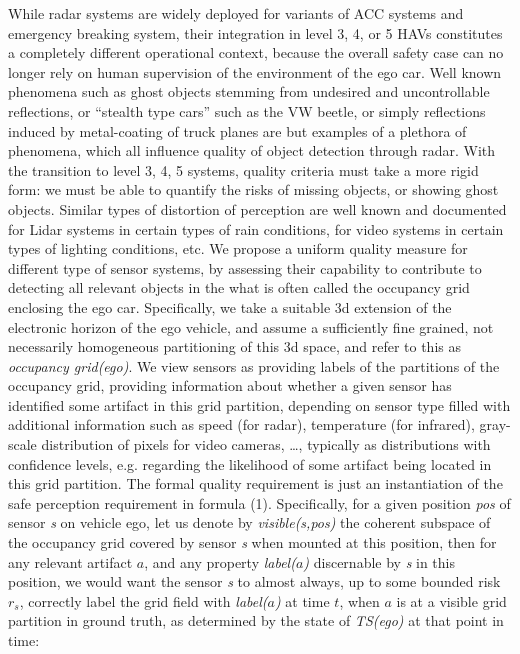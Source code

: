 While radar systems are widely deployed for variants of ACC systems and emergency breaking system, their integration in level 3, 4, or 5 HAVs constitutes a completely different operational context, because the overall safety case can no longer rely on human supervision of the environment of the ego car. Well known phenomena such as ghost objects stemming from undesired and uncontrollable reflections, or \enquote{stealth type cars} such as the VW beetle, or simply reflections induced by metal-coating of truck planes are but examples of a plethora of phenomena, which all influence quality of object detection through radar. With the transition to level 3, 4, 5 systems, quality criteria must take a more rigid form: we must be able to quantify the risks of missing objects, or showing ghost objects. Similar types of distortion of perception are well known and documented for Lidar systems in certain types of rain conditions, for video systems in certain types of lighting conditions, etc. We propose a uniform quality measure for different type of sensor systems, by assessing their capability to contribute to detecting all relevant objects in the what is often called the occupancy grid enclosing the ego car. Specifically, we take a suitable 3d extension of the electronic horizon of the ego vehicle, and assume a sufficiently fine grained, not necessarily homogeneous partitioning of this 3d space, and refer to this as \emph{occupancy grid(ego)}. We view sensors as providing labels of the partitions of the occupancy grid, providing information about whether a given sensor has identified some artifact in this grid partition, depending on sensor type filled with additional information such as speed (for radar), temperature (for infrared), gray-scale distribution of pixels for video cameras, \ldots, typically as distributions with confidence levels, e.g. regarding the likelihood of some artifact being located in this grid partition. The formal quality requirement is just an instantiation of the safe perception requirement in formula (1). Specifically, for a given position \textit{pos}  of sensor  \textit{s}  on vehicle ego, let us denote by \textit{visible(s,pos)} the coherent subspace of the occupancy grid covered by sensor \textit{s} when mounted at this position, then for any relevant artifact  $a$, and any property  \textit{label($a$)} discernable by  \textit{s}  in this position, we would want the sensor \textit{s} to almost always, up to some bounded risk $r_s$, correctly label the grid field with \textit{label($a$)} at time $t$, when $a$ is at a visible grid partition in ground truth, as determined by the state of \textit{TS(ego)} at that point in time:


